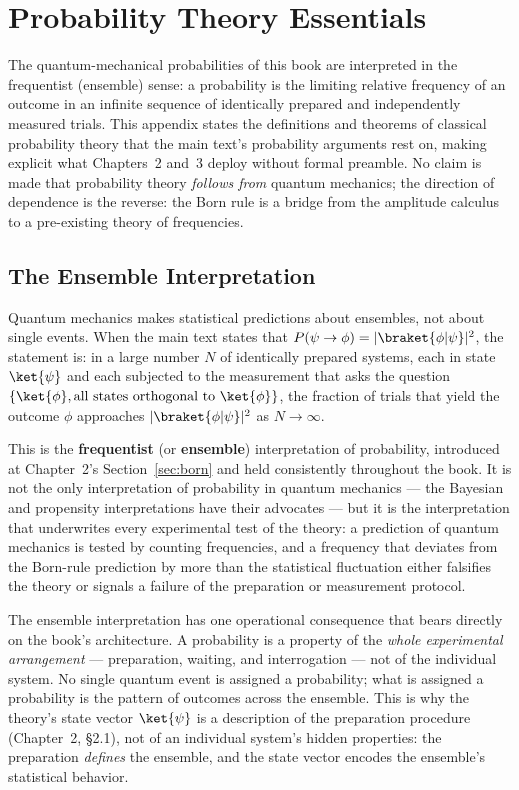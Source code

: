 \chapter{Probability Theory Essentials}

\begin{note}
The quantum-mechanical probabilities of this book are interpreted in the frequentist (ensemble) sense: a probability is the limiting relative frequency of an outcome in an infinite sequence of identically prepared and independently measured trials. This appendix states the definitions and theorems of classical probability theory that the main text's probability arguments rest on, making explicit what Chapters~2 and~3 deploy without formal preamble. No claim is made that probability theory \emph{follows from} quantum mechanics; the direction of dependence is the reverse: the Born rule is a bridge from the amplitude calculus to a pre-existing theory of frequencies.
\end{note}

\section{The Ensemble Interpretation}
\label{sec:ensemble-interpretation}

Quantum mechanics makes statistical predictions about ensembles, not about single events. When the main text states that $P(\psi \to \phi) = |\braket{\phi|\psi}|^2$, the statement is: in a large number $N$ of identically prepared systems, each in state $\ket{\psi}$ and each subjected to the measurement that asks the question $\{\ket{\phi}, \text{all states orthogonal to } \ket{\phi}\}$, the fraction of trials that yield the outcome $\phi$ approaches $|\braket{\phi|\psi}|^2$ as $N \to \infty$.

This is the \textbf{frequentist} (or \textbf{ensemble}) interpretation of probability, introduced at Chapter~2's Section~\ref{sec:born} and held consistently throughout the book. It is not the only interpretation of probability in quantum mechanics --- the Bayesian and propensity interpretations have their advocates --- but it is the interpretation that underwrites every experimental test of the theory: a prediction of quantum mechanics is tested by counting frequencies, and a frequency that deviates from the Born-rule prediction by more than the statistical fluctuation either falsifies the theory or signals a failure of the preparation or measurement protocol.

The ensemble interpretation has one operational consequence that bears directly on the book's architecture. A probability is a property of the \emph{whole experimental arrangement} --- preparation, waiting, and interrogation --- not of the individual system. No single quantum event is assigned a probability; what is assigned a probability is the pattern of outcomes across the ensemble. This is why the theory's state vector $\ket{\psi}$ is a description of the preparation procedure (Chapter~2, §2.1), not of an individual system's hidden properties: the preparation \emph{defines} the ensemble, and the state vector encodes the ensemble's statistical behavior.

